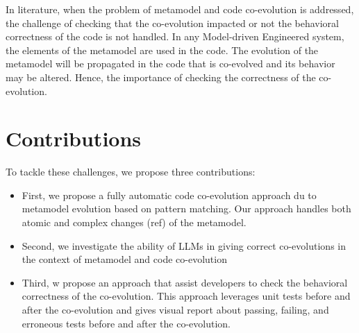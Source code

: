 In literature, when the problem of metamodel and code co-evolution is addressed, the challenge of checking that the co-evolution impacted or not the behavioral correctness of the code is not handled. In any Model-driven Engineered system, the elements of the metamodel are used in the code. The evolution of the metamodel will be propagated in the code that is co-evolved and its behavior may be altered. Hence, the importance of checking the correctness of the co-evolution.
\section*{Contributions}
To tackle these challenges, we propose three contributions:
\begin{itemize}
	\item First, we propose a fully automatic code co-evolution approach du to  metamodel evolution based on pattern matching. Our approach handles both atomic and complex changes (ref) of the metamodel.
	\item Second, we investigate the ability of LLMs in giving correct co-evolutions in the context of metamodel and code co-evolution
	
	\item Third, w propose an approach that assist developers to check the behavioral correctness of the co-evolution. This approach leverages unit tests before and after the co-evolution and gives visual report about passing, failing, and erroneous tests before and after the co-evolution.

\end{itemize}





